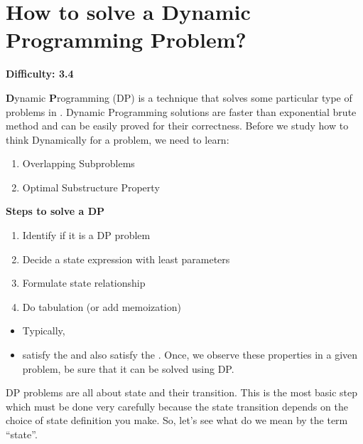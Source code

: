 \section{How to solve a Dynamic Programming Problem?
  \label{secGFGDPHowToSolve}}

\textbf{Difficulty: 3.4}

\textbf{D}ynamic \textbf{P}rogramming (DP) is a technique that solves some
particular type of problems in . Dynamic Programming
solutions are faster than exponential brute method and can be easily proved
for their correctness.  Before we study how to think Dynamically for a
problem, we need to learn:
\begin{enumerate}[label=\textbf{\arabic*.}]
\item Overlapping Subproblems
\item Optimal Substructure Property
\end{enumerate}

\textbf{Steps to solve a DP}
\begin{enumerate}[label=\textbf{\arabic*.}]
\item Identify if it is a DP problem
\item Decide a state expression with least parameters
\item Formulate state relationship    
\item Do tabulation (or add memoization)
\end{enumerate}


\begin{itemize}%
\item Typically, 
\item {} satisfy the  and 
  also satisfy the . Once, we observe
  these properties in a given problem, be sure that it can be solved using
  DP.
\end{itemize}


DP problems are all about state and their transition. This is the most basic
step which must be done very carefully because the state transition depends
on the choice of state definition you make. So, let's see what do we mean by
the term ``state''.

